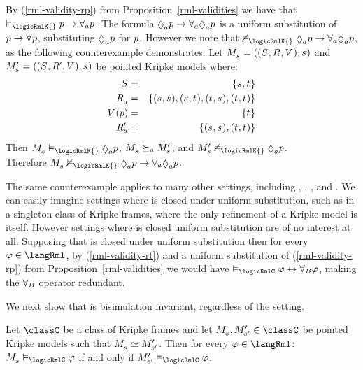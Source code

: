 \begin{example}\label{example-uniform-substitution}
By (\ref{rml-validity-rp}) from Proposition~\ref{rml-validities} we have that $\entails_\logicRmlK{} \atomP \implies \allrefsA \atomP$.
The formula $\possibleA \atomP \implies \allrefsA \possibleA \atomP$ is a uniform substitution of $\atomP \implies \allrefs \atomP$, substituting $\possibleA \atomP$ for $p$.
However we note that $\nentails_\logicRmlK{} \possibleA \atomP \implies \allrefsA \possibleA \atomP$, as the following counterexample demonstrates.
Let $\kPModelAndTuple{\kStateS}$ and $\kPModelP{\kStateS} = ((\kStates, \kAccessibilityP{}, \kValuation), \kStateS)$ be pointed Kripke models where:
\begin{eqnarray*}
    \kStates &=& \{\kStateS, \kStateT\}\\
    \kAccessibilityA &=& \{(\kStateS, \kStateS), (\kStateS, \kStateT), (\kStateT, \kStateS), (\kStateT, \kStateT)\}\\
    \kValuation(\atomP) &=& \{\kStateT\}\\
    \kAccessibilityPA &=& \{(\kStateS, \kStateS), (\kStateT, \kStateT)\}
\end{eqnarray*}
Then $\kPModel{\kStateS} \entails_\logicRmlK{} \possibleA \atomP$, $\kPModel{\kStateS} \simulatesA \kPModelP{\kStateS}$, and $\kPModelP{\kStateS} \nentails_\logicRmlK{} \possibleA \atomP$.\\
Therefore $\kPModel{\kStateS} \nentails_\logicRmlK{} \possibleA \atomP \implies \allrefsA \possibleA \atomP$.
\end{example}

The same counterexample applies to many other settings, including \classKF{}, \classKFF{}, \classKD{}, and \classS{}.
We can easily imagine settings where \logicRml{} is closed under uniform substitution, such as in a singleton class of Kripke frames, where the only refinement of a Kripke model is itself.
However settings where \logicRml{} is closed uniform substitution are of no interest at all.
Supposing that \logicRmlC{} is closed under uniform substitution then for every $\phi \in \langRml$, by (\ref{rml-validity-rt}) and a uniform substitution of (\ref{rml-validity-rp}) from Proposition~\ref{rml-validities} we would have $\entails_\logicRmlC \phi \iff \allrefsBs \phi$, making the ${\forall_{B}}$ operator redundant.

We next show that \logicRml{} is bisimulation invariant, regardless of the setting.

\begin{proposition}\label{rml-bisimulation-invariance}
Let $\classC$ be a class of Kripke frames and let $\kPModel{\kStateS}, \kPModelP{\kStateSP} \in \classC$ be pointed Kripke models such that $\kPModel{\kStateS} \bisimilar \kPModelP{\kStateSP}$.
Then for every $\phi \in \langRml$:
$\kPModel{\kStateS} \entails_\logicRmlC \phi$ if and only if $\kPModelP{\kStateSP} \entails_\logicRmlC \phi$.
\end{proposition}

